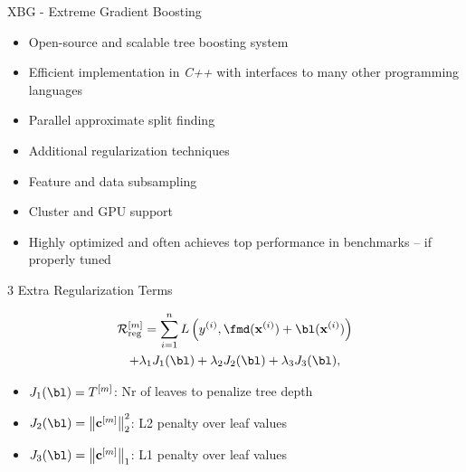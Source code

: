 \documentclass[11pt,compress,t,notes=noshow, xcolor=table]{beamer}
\begin{document}


\begin{vbframe}{XBG - Extreme Gradient Boosting}



  \begin{itemize}
    \item Open-source and scalable tree boosting system
    \item Efficient implementation in \emph{C++} with interfaces to many other programming languages
    \item Parallel approximate split finding
    \item Additional regularization techniques
    \item Feature and data subsampling
    \item Cluster and GPU support
    \item Highly optimized and often achieves top performance in benchmarks 
        -- if properly tuned
  \end{itemize}

\end{vbframe}

\begin{frame}{3 Extra Regularization Terms}


  \begin{multline*}
    \riskr^{[m]} = \sum_{i=1}^{n} L\left(\yi, \fmd(\xi) + \bl(\xi)\right)\\
    + \lambda_1 J_1(\bl) + \lambda_2 J_2(\bl) + \lambda_3 J_3(\bl),
  \end{multline*}

  \lz
  \begin{itemize}
    \item $J_1(\bl) = T^{[m]}$:  Nr of leaves to penalize tree depth
    \item $J_2(\bl) = \left\|\mathbf{c}^{[m]}\right\|^2_2$:  L2 penalty over leaf values 
    \item $J_3(\bl) = \left\|\mathbf{c}^{[m]}\right\|_1$: L1 penalty over leaf values 
  \end{itemize}
\end{frame}
\end{document}
